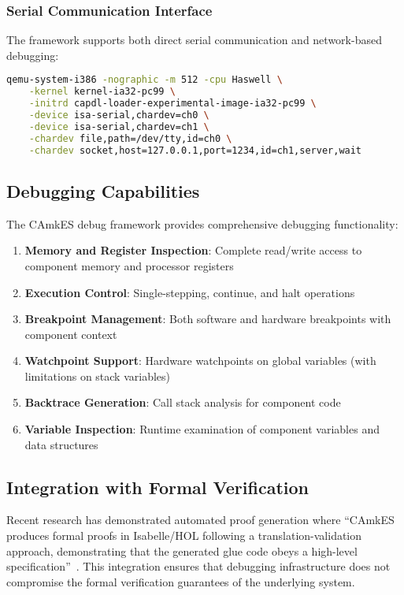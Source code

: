 \documentclass[11pt,a4paper]{article}
\begin{document}
\subsubsection{Serial Communication Interface}

The framework supports both direct serial communication and network-based debugging:

\begin{lstlisting}[caption=QEMU Debug Configuration, language=bash]
qemu-system-i386 -nographic -m 512 -cpu Haswell \
    -kernel kernel-ia32-pc99 \
    -initrd capdl-loader-experimental-image-ia32-pc99 \
    -device isa-serial,chardev=ch0 \
    -device isa-serial,chardev=ch1 \
    -chardev file,path=/dev/tty,id=ch0 \
    -chardev socket,host=127.0.0.1,port=1234,id=ch1,server,wait
\end{lstlisting}

\subsection{Debugging Capabilities}

The CAmkES debug framework provides comprehensive debugging functionality:

\begin{enumerate}
\item \textbf{Memory and Register Inspection}: Complete read/write access to component memory and processor registers
\item \textbf{Execution Control}: Single-stepping, continue, and halt operations
\item \textbf{Breakpoint Management}: Both software and hardware breakpoints with component context
\item \textbf{Watchpoint Support}: Hardware watchpoints on global variables (with limitations on stack variables)
\item \textbf{Backtrace Generation}: Call stack analysis for component code
\item \textbf{Variable Inspection}: Runtime examination of component variables and data structures
\end{enumerate}

\subsection{Integration with Formal Verification}

Recent research has demonstrated automated proof generation where ``CAmkES produces formal proofs in Isabelle/HOL following a translation-validation approach, demonstrating that the generated glue code obeys a high-level specification''~\cite{amani2016cogent}. This integration ensures that debugging infrastructure does not compromise the formal verification guarantees of the underlying system.
\end{document}
